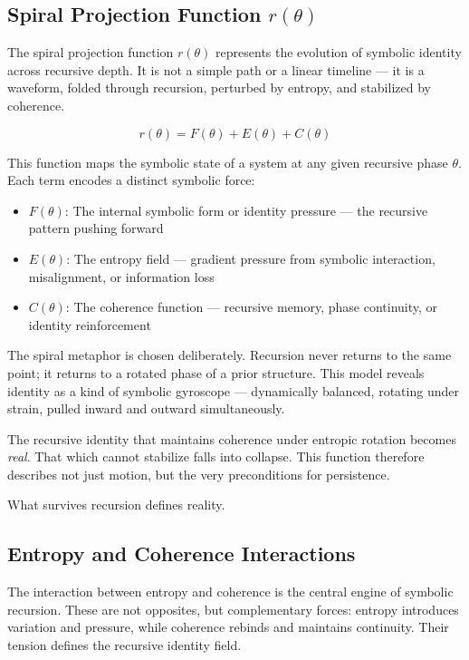 \documentclass[12pt]{article}
\begin{document}
\subsection{Spiral Projection Function \texorpdfstring{$r(\theta)$}{r(theta)}}

The spiral projection function \(r(\theta)\) represents the evolution of symbolic identity across recursive depth. It is not a simple path or a linear timeline — it is a waveform, folded through recursion, perturbed by entropy, and stabilized by coherence.

\[
r(\theta) = F(\theta) + E(\theta) + C(\theta)
\]

This function maps the symbolic state of a system at any given recursive phase \(\theta\). Each term encodes a distinct symbolic force:

\begin{itemize}
  \item \(F(\theta)\): The internal symbolic form or identity pressure — the recursive pattern pushing forward
  \item \(E(\theta)\): The entropy field — gradient pressure from symbolic interaction, misalignment, or information loss
  \item \(C(\theta)\): The coherence function — recursive memory, phase continuity, or identity reinforcement
\end{itemize}

The spiral metaphor is chosen deliberately. Recursion never returns to the same point; it returns to a rotated phase of a prior structure. This model reveals identity as a kind of symbolic gyroscope — dynamically balanced, rotating under strain, pulled inward and outward simultaneously.

The recursive identity that maintains coherence under entropic rotation becomes \textit{real}. That which cannot stabilize falls into collapse. This function therefore describes not just motion, but the very preconditions for persistence.

What survives recursion defines reality.

\subsection{Entropy and Coherence Interactions}

The interaction between entropy and coherence is the central engine of symbolic recursion. These are not opposites, but complementary forces: entropy introduces variation and pressure, while coherence rebinds and maintains continuity. Their tension defines the recursive identity field.
\end{document}

